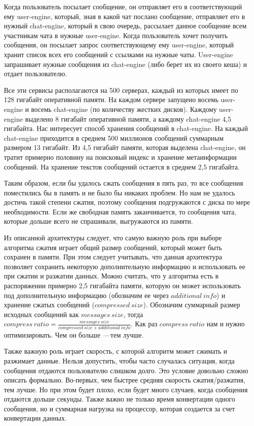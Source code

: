 Когда пользователь посылает сообщение, он отправляет его в соответствующий ему user-engine, 
который, зная в какой чат послано сообщение, отправляет его в нужный chat-engine, который в свою
 очередь, рассылает данное сообщение всем участникам чата в нужные user-engine. 
Когда пользователь хочет получить сообщения, он посылает запрос соответствующему ему user-engine, 
который хранит список всех его сообщений с ссылками на нужные чаты. User-engine запрашивает нужные сообщения
 из chat-engine (либо берет их из своего кеша) и отдает пользователю.


Все эти сервисы располагаются на 500 серверах, каждый из которых имеет по 128 гигабайт оперативной
 памяти. На каждом сервере запущено восемь user-engine и восемь chat-engine (по количеству жестких 
 дисков). Каждому user-engine выделено 8 гигабайт оперативной памяти, а каждому chat-engine 4,5 
 гигабайта. Нас интересует способ хранения сообщений в chat-engine. На каждый chat-engine приходится 
 в среднем 500 миллионов сообщений суммарным размером 13 гигабайт. Из 4,5 гигабайт памяти,
 которая выделена chat-engine, он тратит примерно половину на поисковый индекс и хранение метаинформации сообщений.
 На хранение текстов сообщений остается в среднем 2,5 гигабайта.


 Таким образом, если бы удалось сжать сообщения в пять раз, то все сообщения поместились бы в память и 
 не было бы никаких проблем. Но нам не удалось достичь такой степени сжатия, поэтому сообщения подгружаются с диска
 по мере необходимости. Если же свободная память заканчивается, то сообщения чата, которые дольше всего не спрашивали,
 выгружаются из памяти.

 Из описанной архитектуры следует, что самую важную роль при выборе алгоритма сжатия играет общий размер сообщений, 
 который может быть сохранен в памяти.
 При этом следует учитывать, что данная архитектура позволяет сохранить некоторую дополнительную информацию и использовать ее
 при сжатии и разжатии данных. Можно считать, что у алгоритма есть в распоряжении примерно 2,5 гигабайта памяти, которую он 
 может использовать под дополнительную информацию (обозначим ее через $additional\ info$) и хранение сжатых сообщений ($compressed\ size$).
Обозначим суммарный размер исходных сообщений как $messages\ size$, тогда $compress\ ratio = \frac{messages\ size}{compressed\ size + additional\ info}$.
Как раз $compress\ ratio$ нам и нужно оптимизировать. Чем он больше~---тем лучше.

Также важную роль играет скорость, с которой алгоритм может сжимать и разжимает данные. 
Нельзя допустить, чтобы часто случалась ситуация, когда сообщения отдаются пользователю слишком долго. 
Это условие довольно сложно описать формально. Во-первых, чем быстрее средняя скорость сжатия/разжатия, тем лучше.
Но при этом будет плохо, если будет много случаев, когда сообщения отдаются дольше секунды. Также важно не
только время конвертации одного сообщения, но и суммарная нагрузка на процессор, которая создается за счет 
конвертации данных.

